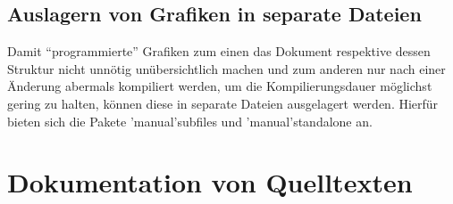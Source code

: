 \documentclass[%
  english,ngerman,%
  cdgeometry=no,DIV=12,%
  cd=false,cdfont=false,cdtitle=true,%
  headings=normal,%
  automark,%
  listof=toc,%
]{tudscrartcl}
\begin{document}
\subsection{Auslagern von Grafiken in separate Dateien}

Damit \enquote{programmierte} Grafiken zum einen das Dokument respektive dessen 
Struktur nicht unnötig unübersichtlich machen und zum anderen nur nach einer 
Änderung abermals kompiliert werden, um die Kompilierungsdauer möglichst gering 
zu halten, können diese in separate Dateien ausgelagert werden. Hierfür bieten 
sich die Pakete \Package'manual'{subfiles} und \Package'manual'{standalone} an.



\section{Dokumentation von Quelltexten}
\end{document}
